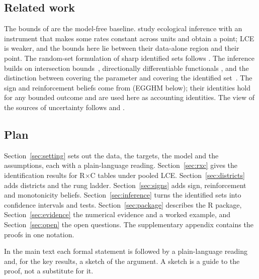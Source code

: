 \subsection{Related work}

The bounds of \citet{duncan1953} are the model-free baseline. \citet{crossmanski2002}
study ecological inference with an instrument that makes some rates constant
across units and obtain a point; LCE is weaker, and the bounds here lie between
their data-alone region and their point. The random-set formulation of sharp
identified sets follows \citet{bmm2011}. The inference builds on intersection
bounds~\citep{clr2013}, directionally differentiable functionals
\citep{shapiro1991,fangsantos2019}, and the distinction between covering the
parameter and covering the identified set~\citep{imbensmanski2004,stoye2009}.
The sign and reinforcement beliefs come from \citet{egghm2025} (EGGHM below);
their identities hold for any bounded outcome and are used here as accounting
identities. The view of the sources of uncertainty follows
\citet{aaiw2023} and \citet{aiz2014}.

\subsection{Plan}

Section~\ref{sec:setting} sets out the data, the targets, the model and the
assumptions, each with a plain-language reading. Section~\ref{sec:rxc} gives
the identification results for R$\times$C tables under pooled LCE.
Section~\ref{sec:districts} adds districts and the rung ladder.
Section~\ref{sec:signs} adds sign, reinforcement and monotonicity beliefs.
Section~\ref{sec:inference} turns the identified sets into confidence intervals
and tests. Section~\ref{sec:package} describes the R package,
Section~\ref{sec:evidence} the numerical evidence and a worked example, and
Section~\ref{sec:open} the open questions. The supplementary appendix contains
the proofs in one notation.

In the main text each formal statement is followed by a plain-language reading
and, for the key results, a sketch of the argument. A sketch is a guide to the
proof, not a substitute for it.
